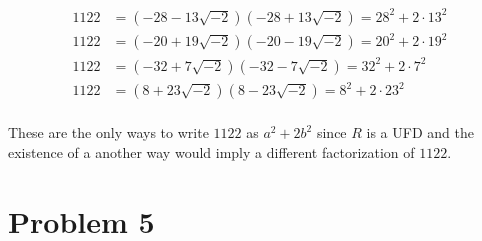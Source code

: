 \documentclass{article}
\begin{document}
\begin{align*}
	1122 &= (-28 - 13\sqrt{-2})(-28 + 13\sqrt{-2}) = 28^2 + 2\cdot 13^2 \\
	1122 &= (-20 + 19\sqrt{-2})(-20 - 19\sqrt{-2}) = 20^2 + 2\cdot 19^2 \\
	1122 &= (-32 + 7\sqrt{-2})(-32 - 7\sqrt{-2}) = 32^2 + 2\cdot 7^2 \\
	1122 &= (8 + 23\sqrt{-2})(8 - 23\sqrt{-2}) = 8^2 + 2\cdot 23^2 \\
\end{align*}

These are the only ways to write $1122$ as $a^2 + 2b^2$ since $R$ is a UFD and 
the existence of a another way would imply a different factorization of $1122$.
\newpage 

\section*{Problem 5}
\end{document}
